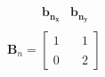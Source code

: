 \documentclass[preview]{standalone}
\begin{document}
\begin{align*}
\begin{array}{c}\begin{matrix}\hspace{1cm} \mathbf{b_{n_x}} & \mathbf{b_{n_y}} \end{matrix} \\  \mathbf{B}_n = \begin{bmatrix} 1 & \quad 1 \\ \\0 & \quad 2 \end{bmatrix} \end{array}
\end{align*}
\end{document}
